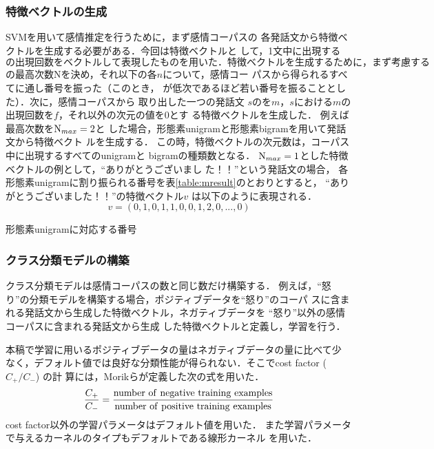 \documentclass[japanese]{jnlp_1.4}
\def\ngram{}
\def\NGRAM{}
\begin{document}
\subsubsection{特徴ベクトルの生成\label{sec:sent2vec}}

SVMを用いて感情推定を行うために，まず感情コーパスの
各発話文から特徴ベクトルを生成する必要がある．今回は特徴ベクトルと
して，1文中に出現する$\ngram$の出現回数をベクトルして表現したものを用い
た．
特徴ベクトルを生成するために，
まず考慮する$\ngram$の最高次数Nを決め，それ以下の各$n$について，感情コー
パスから得られる\NGRAM すべてに通し番号を振った（このとき，
\NGRAM が低次であるほど若い番号を振ることとした）．次に，感情コーパスから
取り出した一つの発話文
$s$の\NGRAM を$m$，$s$における$m$の出現回数を$f$，それ以外の次元の値を0とす
る特徴ベクトルを生成した．
例えば最高次数を${\rm N}_{max} = 2$と
した場合，形態素unigramと形態素bigramを用いて発話文から特徴ベクト
ルを生成する．
この時，特徴ベクトルの次元数は，コーパス中に出現するすべてのunigramと
bigramの種類数となる．
${\rm N}_{max} = 1$とした特徴ベクトルの例として，``ありがとうございまし
た！！''という発話文の場合，
各形態素unigramに割り振られる番号を表\ref{table:mresult}のとおりとすると，
``ありがとうございました！！''の特徴ベクトル$v$
は以下のように表現される．
\begin{equation}
 v = (0, 1, 0, 1, 1, 0, 0, 1, 2, 0, ..., 0) \label{eq:sent_vec}
\end{equation}

\begin{table}[b]
  \caption{形態素unigramに対応する番号}
  \label{table:mresult}

\end{table}



\subsubsection{クラス分類モデルの構築}

クラス分類モデルは感情コーパスの数と同じ数だけ構築する．
例えば，``怒り''の分類モデルを構築する場合，ポジティブデータを``怒り''のコーパ
スに含まれる発話文から生成した特徴ベクトル，ネガティブデータを
``怒り''以外の感情コーパスに含まれる発話文から生成
した特徴ベクトルと定義し，学習を行う．

本稿で学習に用いるポジティブデータの量はネガティブデータの量に比べて少
なく，デフォルト値では良好な分類性能が得られない．そこでcost factor
 ($C_{+}/C_{-}$) の計
算には，Morikらが定義した次の式を用いた\cite{morik}．
\begin{equation}
 \frac{C_{+}}{C_{-}} 
  = \frac{\rm number\ of\ negative\ training\
  examples}{\rm number\ of\ positive\ training\ examples}
\end{equation}
cost factor以外の学習パラメータはデフォルト値を用いた．
また学習パラメータで与えるカーネルのタイプもデフォルトである線形カーネル
を用いた．
\end{document}
